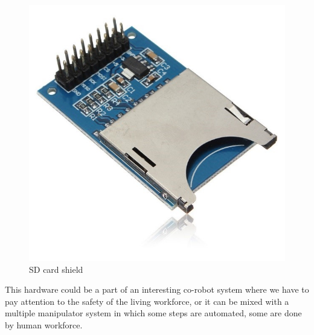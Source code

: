 		\begin{figure}[H]
			\centering
			\includegraphics[scale=0.75]{./images/sd_card_shield}
			\caption{SD card shield}
		\end{figure}
		
		This hardware could be a part of an interesting co-robot system where we have to pay attention to the safety of the living workforce, or it can be mixed with a multiple manipulator system in which some steps are automated, some are done by human workforce.